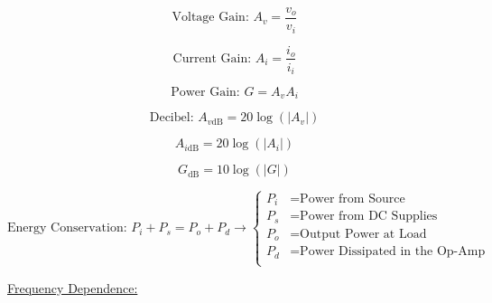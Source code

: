 \documentclass[12pt]{article}
\begin{document}
\begin{multicols}{3}

  \begin{equation*}
    \text{Voltage Gain: }A_v=\frac{v_o}{v_i}
  \end{equation*}

  \begin{equation*}
    \text{Current Gain: }A_i=\frac{i_o}{i_i}
  \end{equation*}

  \begin{equation*}
    \text{Power Gain: }G=A_vA_i
  \end{equation*}

\end{multicols}

\vspace{-30pt}

\begin{multicols}{3}

  \begin{equation*}
    \text{Decibel: }A_{v\text{dB}}=20\log(|A_v|)
  \end{equation*}

  \begin{equation*}
    A_{i\text{dB}}=20\log(|A_i|)
  \end{equation*}

  \begin{equation*}
    G_{\text{dB}}=10\log(|G|)
  \end{equation*}

\end{multicols}

\vspace{-25pt}

$$\boxed{\text{Energy Conservation: }P_i+P_s=P_o+P_d\longrightarrow \left\{\begin{array}{ll} P_i&=\text{Power from Source}\\P_s&=\text{Power from DC Supplies}\\P_o&=\text{Output Power at Load}\\P_d&=\text{Power Dissipated in the Op-Amp}\\ \end{array}}$$

    \begin{center}
      \underline{Frequency Dependence:}
    \end{center}

    \vspace{-25pt}
\end{document}
